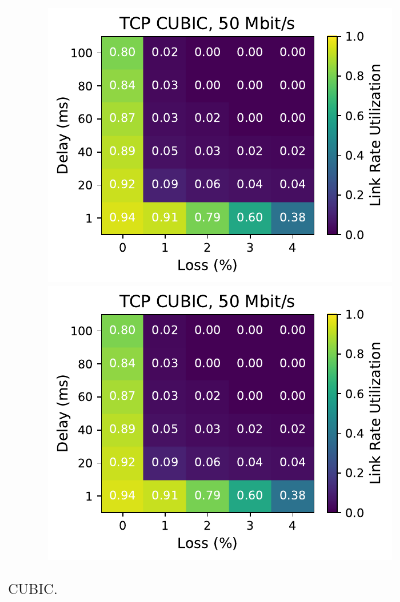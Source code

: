 \begin{figure}[ht]
\begin{subfigure}[b]{0.89cm}
        \includegraphics[width=\linewidth,trim={8cm 0 0 0},clip]{splitting/figures/heatmaps/heatmap_tcp_cubic_50mbps.pdf}
        \includegraphics[width=\linewidth,trim={8cm 0 0 0},clip]{splitting/figures/heatmaps/heatmap_tcp_cubic_50mbps.pdf}
        \vspace*{0.2cm}
    \end{subfigure}
    \caption{CUBIC.}
\end{figure}

